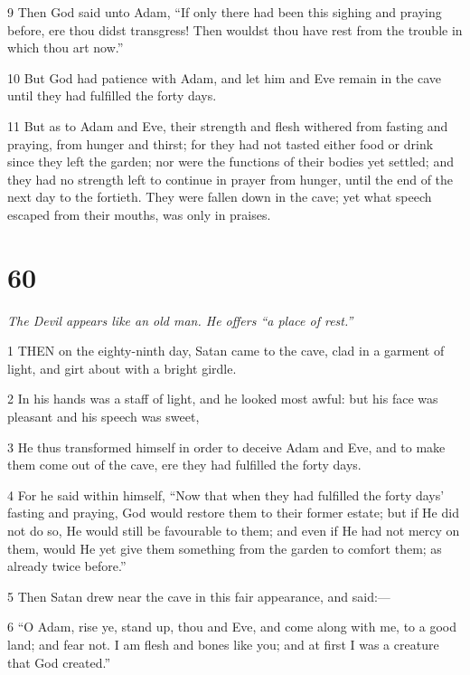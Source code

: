 \par 9 Then God said unto Adam, “If only there had been this sighing and praying before, ere thou didst transgress! Then wouldst thou have rest from the trouble in which thou art now.”

\par 10 But God had patience with Adam, and let him and Eve remain in the cave until they had fulfilled the forty days.

\par 11 But as to Adam and Eve, their strength and flesh withered from fasting and praying, from hunger and thirst; for they had not tasted either food or drink since they left the garden; nor were the functions of their bodies yet settled; and they had no strength left to continue in prayer from hunger, until the end of the next day to the fortieth. They were fallen down in the cave; yet what speech escaped from their mouths, was only in praises.

\chapter{60}

\par \textit{The Devil appears like an old man. He offers “a place of rest.”}

\par 1 THEN on the eighty-ninth day, Satan came to the cave, clad in a garment of light, and girt about with a bright girdle.

\par 2 In his hands was a staff of light, and he looked most awful: but his face was pleasant and his speech was sweet,

\par 3 He thus transformed himself in order to deceive Adam and Eve, and to make them come out of the cave, ere they had fulfilled the forty days.

\par 4 For he said within himself, “Now that when they had fulfilled the forty days' fasting and praying, God would restore them to their former estate; but if He did not do so, He would still be favourable to them; and even if He had not mercy on them, would He yet give them something from the garden to comfort them; as already twice before.”

\par 5 Then Satan drew near the cave in this fair appearance, and said:—

\par 6 “O Adam, rise ye, stand up, thou and Eve, and come along with me, to a good land; and fear not. I am flesh and bones like you; and at first I was a creature that God created.”


